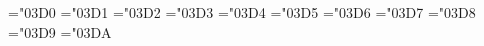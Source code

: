 \def\choosefont#1#2{
  \def\do##1##2##3##4{%
    \expandafter\@font\csname ##1#1\endcsname{#2 at##2pt}}}

%
%

\iflucida

\def\neq{\mathrel{\fam\arfam\mathchar"7094}}


\def\big#1{{\hbox{$\left#1\vbox to8.20\p@{}\right.\n@space$}}}
\def\Big#1{{\hbox{$\left#1\vbox to10.80\p@{}\right.\n@space$}}}
\def\bigg#1{{\hbox{$\left#1\vbox to13.42\p@{}\right.\n@space$}}}
\def\Bigg#1{{\hbox{$\left#1\vbox to16.03\p@{}\right.\n@space$}}}
\def\biggg#1{{\hbox{$\left#1\vbox to17.72\p@{}\right.\n@space$}}}
\def\Biggg#1{{\hbox{$\left#1\vbox to21.25\p@{}\right.\n@space$}}}
\def\n@space{\nulldelimiterspace\z@ \m@th}


\def\bigggl{\mathopen\biggg}
\def\bigggr{\mathclose\biggg}
\def\Bigggl{\mathopen\Biggg}
\def\Bigggr{\mathclose\Biggg}



\mathchardef\Gamma="03D0
\mathchardef\Delta="03D1
\mathchardef\Theta="03D2
\mathchardef\Lambda="03D3
\mathchardef\Xi="03D4
\mathchardef\Pi="03D5
\mathchardef\Sigma="03D6
\mathchardef\Upsilon="03D7
\mathchardef\Phi="03D8
\mathchardef\Psi="03D9
\mathchardef\Omega="03DA

